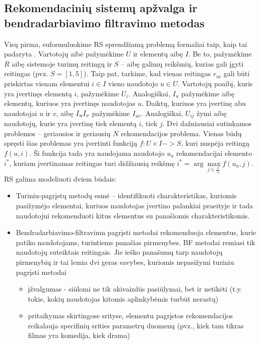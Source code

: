 \documentclass{VUMIFInfMagistrinis}
\begin{document}
\subsection{Rekomendacinių sistemų apžvalga ir bendradarbiavimo filtravimo metodas}
Visų pirma, suformuluokime RS sprendžiamą problemą formaliai taip, kaip tai padaryta \cite{2}. Vartotojų aibė pažymėkime $U$ ir elementų aibę $I$. Be to, pažymėkime $R$ aibę sistemoje turimų reitingų ir $S$ – aibę galimų reikšmių, kurias gali įgyti reitingas (pvz. $S=[1,5]$). Taip pat, tarkime, kad vienas reitingas $r_{ui}$ gali būti priskirtas vienam elementui $i \in I$ vieno naudotojo $u \in U$. Vartotojų poaibį, kuris yra įvertinęs elementą $i$, pažymėkime $U_i$. Analogiškai, $I_u$ pažymėkime aibę elementų, kuriuos yra įvertinęs naudotojas $u$. Daiktų, kuriuos yra įvertinę abu naudotojai $u$ ir $v$, aibę $I_u \relax I_v$ pažymėkime $I_{uv}$. Analogiškai, $U_{ij}$ žymi aibę naudotojų, kurie yra įvertinę tiek elementą $i$, tiek $j$. Dvi dažniausiai sutinkamos problemos – geriausios ir geriausių $N$ rekomendacijos problema. Vienas būdų spręsti šias problemas yra įvertinti funkciją $f: U \times I -> S$, kuri nuspėja reitingą $f(u,i)$. Ši funkcija tada yra naudojama naudotojo $u_a$ rekomendacijai elemento $i^*$, kuriam įvertinamas reitingas turi didžiausią reikšmę $i^*= \arg \max \limits_{j \in \frac{I}{I_u}} f(u_a,j)$. 
RS galima modeliuoti dviem būdais:
\begin{itemize}
	\item Turiniu-pagrįstų metodų esmė – identifikuoti charakteristikas, kuriomis pasižymėjo elementai, kuriuos naudotojas įvertino palankiai praeityje ir tada naudotojui rekomenduoti kitus elementus su panašiomis charakteristikomis.
	\item Bendradarbiavimo-filtravimu pagrįsti metodai rekomenduoja elementus, kurie patiko naudotojams, turintiems panašias pirmenybes. BF metodai remiasi tik naudotojų suteiktais reitingais. Jie ieško panašumų tarp naudotojų pirmenybių ir tai lemia dvi geras savybes, kuriomis nepasižymi turiniu pagrįsti metodai
	\begin{itemize}
		\item įžvalgumas - siūlomi ne tik akivaizdūs pasiūlymai, bet ir netikėti (t.y. tokie, kokių naudotojas kitomis aplinkybėmis turbūt nerastų)
		\item pritaikymas skirtingose srityse, elementu pagrįstos rekomendacijos reikalauja specifinių srities parametrų duomenų (pvz., kiek tam tikras filmas yra komedija, kiek drama)
	\end{itemize}
\end{itemize}
\end{document}

